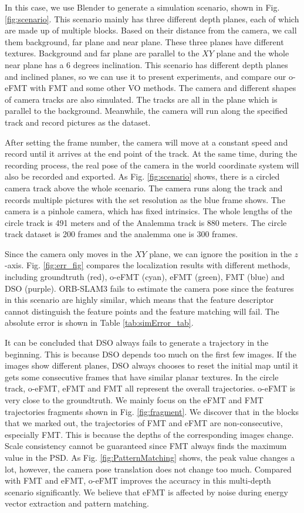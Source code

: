 \documentclass[letterpaper, 10 pt, conference]{ieeeconf}  %
\begin{document}
In this case, we use Blender to generate a simulation scenario, shown in Fig. \ref{fig:scenario}. This scenario mainly has three different depth planes, each of which are made up of multiple blocks. Based on their distance from the camera, we call them background, far plane and near plane. These three planes have different textures. Background and far plane are parallel to the $XY$ plane and the whole near plane has a 6 degrees inclination. This scenario has different depth planes and inclined planes, so we can use it to present experiments, and compare our o-eFMT with FMT and some other VO methods. The camera and different shapes of camera tracks are also simulated. The tracks are all in the plane which is parallel to the background. Meanwhile, the camera will run along the specified track and record pictures as the dataset.

After setting the frame number, the camera will move at a constant speed and record until it arrives at the end point of the track. At the same time, during the recording process, the real pose of the camera in the world coordinate system will also be recorded and exported. As Fig. \ref{fig:scenario} shows, there is a circled camera track above the whole scenario. The camera runs along the track and records multiple pictures with the set resolution as the blue frame shows. The camera is a pinhole camera, which has fixed intrinsics. The whole lengths of the circle track is 491 meters and of the Analemma track is 880 meters. The circle track dataset is 200 frames and the analemma one is 300 frames.

Since the camera only moves in the $XY$ plane, we can ignore the position in the $z$-axis. Fig. \ref{fig:err_fig} compares the localization results with different methods, including groundtruth (red), o-eFMT (cyan), eFMT (green), FMT (blue) and DSO (purple). ORB-SLAM3 fails to estimate the camera pose since the features in this scenario are highly similar, which means that the feature descriptor cannot distinguish the feature points and the feature matching will fail. The absolute error is shown in Table \ref{tab:simError_tab}.

It can be concluded that DSO always fails to generate a trajectory in the beginning. This is because DSO depends too much on the first few images. If the images show different planes, DSO always chooses to reset the initial map until it gets some consecutive frames that have similar planar textures. In the circle track, o-eFMT, eFMT and FMT all represent the overall trajectories. o-eFMT is very close to the groundtruth. We mainly focus on the eFMT and FMT trajectories fragments shown in Fig. \ref{fig:fragment}. We discover that in the blocks that we marked out, the trajectories of FMT and eFMT are non-consecutive, especially FMT. This is because the depths of the corresponding images change. Scale consistency cannot be guaranteed since FMT always finds the maximum value in the PSD. As Fig. \ref{fig:PatternMatching} shows, the peak value changes a lot, however, the camera pose translation does not change too much. Compared with FMT and eFMT, o-eFMT improves the accuracy in this multi-depth scenario significantly. We believe that eFMT is affected by noise during energy vector extraction and pattern matching.
\end{document}
